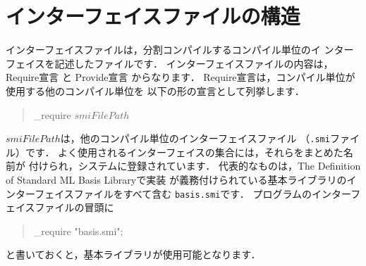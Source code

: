 \documentclass{jbook}
\newif\ifjp
\newcommand{\txt}[2]{#1}
\newenvironment{program}{\begin{quote}\begin{tt}}%
                        {\end{tt}\end{quote}}
\begin{document}
\section{\txt{インターフェイスファイルの構造}{Structure of interface files}}
\label{sec:tutorialInterfaceFile}

\ifjp%
	インターフェイスファイルは，分割コンパイルするコンパイル単位のイ
ンターフェイスを記述したファイルです．
	インターフェイスファイルの内容は，
Require宣言
と
Provide宣言
からなります．
	Require宣言は，コンパイル単位が使用する他のコンパイル単位を
以下の形の宣言として列挙します．
\begin{program}
\_require $smiFilePath$
\end{program}
	$smiFilePath$は，他のコンパイル単位のインターフェイスファイル
（{\tt .smi}ファイル）です．
	よく使用されるインターフェイスの集合には，それらをまとめた名前が
付けられ，システムに登録されています．
	代表的なものは，The Definition of Standard ML Basis Libraryで実装
が義務付けられている基本ライブラリのインターフェイスファイルをすべて含む
{\tt basis.smi}です．
	プログラムのインターフェイスファイルの冒頭に
\begin{program}
\_require "basis.smi";
\end{program}
と書いておくと，基本ライブラリが使用可能となります．
\end{document}
